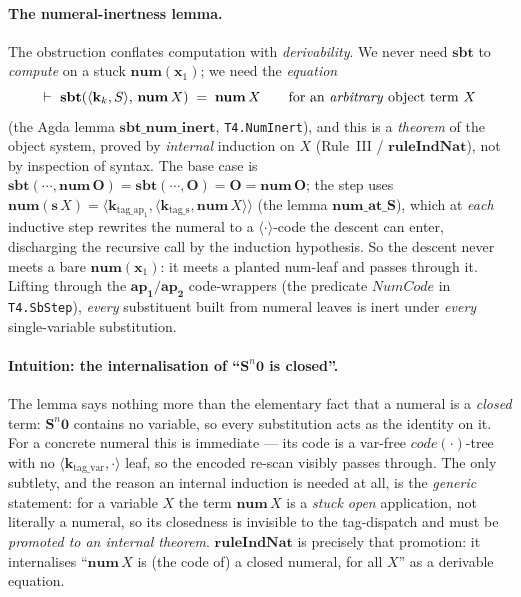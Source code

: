 \documentclass[11pt]{article}
\theoremstyle{plain}
\theoremstyle{definition}
\theoremstyle{remark}
\newcommand{\code}[1]{\mathit{code}(#1)}
\newcommand{\sbt}{\mathbf{sbt}}
\newcommand{\num}{\mathbf{num}}
\newcommand{\seq}[1]{\langle #1 \rangle}
\begin{document}
\paragraph{The numeral-inertness lemma.}  The obstruction conflates
computation with \emph{derivability}.  We never need $\sbt$ to \emph{compute}
on a stuck $\num(\mathbf{x}_1)$; we need the \emph{equation}
\[
\vdash\ \sbt(\seq{\mathbf{k}_k, S},\, \num\,X) \;=\; \num\,X
\qquad\text{for an \emph{arbitrary} object term } X
\]
(the Agda lemma $\mathbf{sbt\_num\_inert}$, \verb|T4.NumInert|), and this is
a \emph{theorem} of the object system, proved by \emph{internal} induction on
$X$ (Rule~III / $\mathbf{ruleIndNat}$), not by inspection of syntax.  The
base case is $\sbt(\cdots, \num\,\mathbf{O}) = \sbt(\cdots,\mathbf{O}) =
\mathbf{O} = \num\,\mathbf{O}$; the step uses $\num(\mathbf{s}\,X) =
\seq{\mathbf{k}_{\mathrm{tag\_ap_1}}, \seq{\mathbf{k}_{\mathrm{tag\_s}},
\num\,X}}$ (the lemma $\mathbf{num\_at\_S}$), which at \emph{each} inductive
step rewrites the numeral to a $\seq{\cdot}$-code the descent can enter,
discharging the recursive call by the induction hypothesis.  So the descent
never meets a bare $\num(\mathbf{x}_1)$: it meets a planted num-leaf and
passes through it.  Lifting through the $\mathbf{ap_1}/\mathbf{ap_2}$
code-wrappers (the predicate $\mathit{NumCode}$ in \verb|T4.SbStep|),
\emph{every} substituent built from numeral leaves is inert under
\emph{every} single-variable substitution.

\paragraph{Intuition: the internalisation of ``$\mathbf{S}^n\mathbf{0}$ is
closed''.}  The lemma says nothing more than the elementary fact that a
numeral is a \emph{closed} term: $\mathbf{S}^n\mathbf{0}$ contains no
variable, so every substitution acts as the identity on it.  For a concrete
numeral this is immediate --- its code is a var-free $\code{\cdot}$-tree with
no $\seq{\mathbf{k}_{\mathrm{tag\_var}}, \cdot}$ leaf, so the encoded re-scan
visibly passes through.  The only subtlety, and the reason an internal
induction is needed at all, is the \emph{generic} statement: for a variable
$X$ the term $\num\,X$ is a \emph{stuck open} application, not literally a
numeral, so its closedness is invisible to the tag-dispatch and must be
\emph{promoted to an internal theorem}.  $\mathbf{ruleIndNat}$ is precisely
that promotion: it internalises ``$\num\,X$ is (the code of) a closed
numeral, for all $X$'' as a derivable equation.
\end{document}
